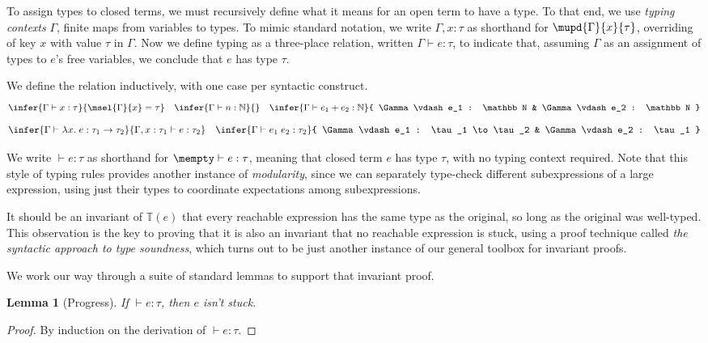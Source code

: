 \documentclass{amsbook}
\newtheorem{lemma}[theorem]{Lemma}
\theoremstyle{definition}
\theoremstyle{remark}
\numberwithin{section}{chapter}
\numberwithin{equation}{chapter}
\begin{document}
\newcommand{\hasty}[3]{#1 \vdash #2 : #3}

To assign types to closed terms, we must recursively define what it means for an open term to have a type.
To that end, we use \emph{typing contexts} $\Gamma$, finite maps from variables to types.
To mimic standard notation, we write $\Gamma, x : \tau$ as shorthand for $\mupd{\Gamma}{x}{\tau}$, overriding of key $x$ with value $\tau$ in $\Gamma$.
Now we define typing as a three-place relation, written $\hasty{\Gamma}{e}{\tau}$, to indicate that, assuming $\Gamma$ as an assignment of types to $e$'s free variables, we conclude that $e$ has type $\tau$.

We define the relation inductively, with one case per syntactic construct.
\modularity
$$\infer{\hasty{\Gamma}{x}{\tau}}{
  \msel{\Gamma}{x} = \tau
}
\quad \infer{\hasty{\Gamma}{n}{\mathbb N}}{}
\quad \infer{\hasty{\Gamma}{e_1 + e_2}{\mathbb N}}{
    \hasty{\Gamma}{e_1}{\mathbb N}
    & \hasty{\Gamma}{e_2}{\mathbb N}
}$$
$$\infer{\hasty{\Gamma}{\lambda x. \; e}{\tau_1 \to \tau_2}}{
  \hasty{\Gamma, x : \tau_1}{e}{\tau_2}
}
\quad \infer{\hasty{\Gamma}{e_1 \; e_2}{\tau_2}}{
  \hasty{\Gamma}{e_1}{\tau_1 \to \tau_2}
  & \hasty{\Gamma}{e_2}{\tau_1}
}$$

We write $\hasty{}{e}{\tau}$ as shorthand for $\hasty{\mempty}{e}{\tau}$, meaning that closed term $e$ has type $\tau$, with no typing context required.
Note that this style of typing rules provides another instance of \emph{modularity}, since we can separately type-check different subexpressions of a large expression, using just their types to coordinate expectations among subexpressions.

It should be an invariant of $\mathbb T(e)$ that every reachable expression has the same type as the original, so long as the original was well-typed.
This observation is the key to proving that it is also an invariant that no reachable expression is stuck, using a proof technique called \emph{the syntactic approach to type soundness}, which turns out to be just another instance of our general toolbox for invariant proofs.

We work our way through a suite of standard lemmas to support that invariant proof.

\begin{lemma}[Progress]\label{progress}
  If $\hasty{}{e}{\tau}$, then $e$ isn't stuck.
\end{lemma}
\begin{proof}
  By induction on the derivation of $\hasty{}{e}{\tau}$.
\end{proof}
\end{document}
